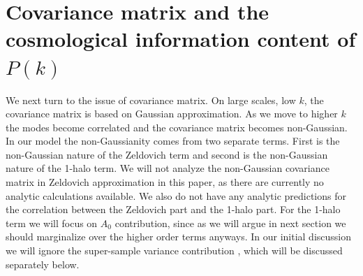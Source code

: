 \documentclass[
  11pt,
  twoside,
  openright,
  titlepage,
  headings=optiontoheadandtoc
]{scrbook}
\begin{document}
\clearpage

\section{Covariance matrix and the cosmological information content of
  \texorpdfstring{$P(k)$}{P(k)}}
\label{p2:sec:covariancematrix}

We next turn to the issue of covariance matrix. On large scales, low $k$, the covariance matrix is based on
Gaussian approximation. 
As we move to higher $k$ the modes become correlated and the covariance matrix becomes non-Gaussian. 
In our model the non-Gaussianity comes from two separate terms. First is the non-Gaussian nature of the 
Zeldovich term and second is the non-Gaussian nature of the 1-halo term. 
We will not analyze the non-Gaussian covariance matrix in Zeldovich approximation in this paper, 
as there are currently no analytic calculations available. 
We also do not have any analytic predictions for the correlation 
between the Zeldovich part and the 1-halo part. For the 1-halo term we will focus on $A_0$ contribution, since as we will argue in next section we should marginalize over the higher order terms anyways. In our 
initial discussion we will
ignore the super-sample variance contribution \citep{2013PhRvD..87l3504T,2014PhRvD..89h3519L}, 
which will be discussed separately below. 
\end{document}
